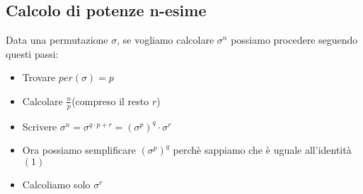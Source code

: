 \documentclass[a4paper, 10pt]{article}
\begin{document}
\subsection{Calcolo di potenze n-esime}

Data una permutazione $\sigma$, se vogliamo calcolare $\sigma^n$ possiamo procedere seguendo questi passi:

\begin{itemize}
	\item Trovare $per(\sigma) = p$
	\item Calcolare $\frac{n}{p}$(compreso il resto $r$)
	\item Scrivere $\sigma^n = \sigma^{q \cdot p + r} = (\sigma^p)^q \cdot \sigma^r$
	\item Ora possiamo semplificare $(\sigma^p)^q$ perchè sappiamo che è uguale all'identità $(1)$
	\item Calcoliamo solo $\sigma^r$
\end{itemize}
\end{document}
